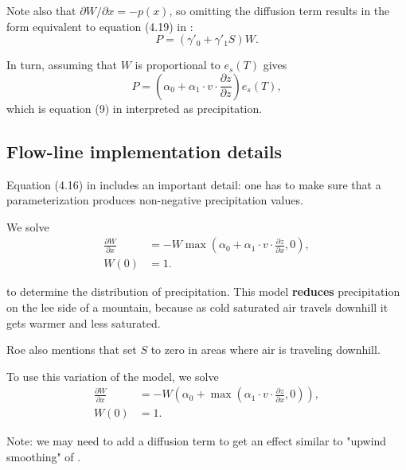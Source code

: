 \documentclass[11pt]{article}
\begin{document}
Note also that $\partial W / \partial x = - p(x)$, so omitting the
diffusion term results in the form equivalent to equation (4.19) in
\cite{roe1999wobbly}:
\begin{equation}
P = (\gamma'_0 + \gamma'_1 S) W.
\end{equation}

In turn, assuming that $W$ is proportional to $e_s(T)$ gives
\begin{equation}
P = \left( \alpha_0 + \alpha_1 \cdot v \cdot \frac{\partial z}{\partial z} \right) e_s(T),
\end{equation}
which is equation (9) in \cite{roe2003orographic} interpreted as precipitation.

\subsection{Flow-line implementation details}
\label{sec-1-2}

Equation (4.16) in \cite{roe1999wobbly} includes an important
detail: one has to make sure that a parameterization produces
non-negative precipitation values.

We solve
\begin{align}
  \frac{\partial W}{\partial x} &= -W \max\left(\alpha_0 + \alpha_1 \cdot v \cdot \frac{\partial z}{\partial x}, 0 \right),\\
  W(0) &= 1.
\end{align}

to determine the distribution of precipitation. This model \textbf{reduces}
precipitation on the lee side of a mountain, because as cold
saturated air travels downhill it gets warmer and less saturated.

Roe \cite{roe1999wobbly} also mentions that
\cite{sanberg1983modelling} set $S$ to zero in areas where air is
traveling downhill.

To use this variation of the model, we solve
\begin{align}
  \frac{\partial W}{\partial x} &= -W \left( \alpha_0 + \max\left(\alpha_1 \cdot v \cdot \frac{\partial z}{\partial x}, 0 \right) \right),\\
  W(0) &= 1.
\end{align}

Note: we may need to add a diffusion term to get an effect similar
to "upwind smoothing" of \cite{roe2003orographic}.
\end{document}

